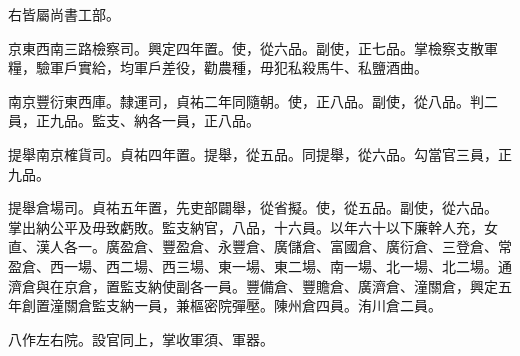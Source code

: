 \begin{pinyinscope}
 右皆屬尚書工部。



 京東西南三路檢察司。興定四年置。使，從六品。副使，正七品。掌檢察支散軍糧，驗軍戶實給，均軍戶差役，勸農種，毋犯私殺馬牛、私鹽酒曲。



 南京豐衍東西庫。隸運司，貞祐二年同隨朝。使，正八品。副使，從八品。判二員，正九品。監支、納各一員，正八品。



 提舉南京榷貨司。貞祐四年置。提舉，從五品。同提舉，從六品。勾當官三員，正九品。



 提舉倉場司。貞祐五年置，先吏部闢舉，從省擬。使，從五品。副使，從六品。
 掌出納公平及毋致虧敗。監支納官，八品，十六員。以年六十以下廉幹人充，女直、漢人各一。廣盈倉、豐盈倉、永豐倉、廣儲倉、富國倉、廣衍倉、三登倉、常盈倉、西一場、西二場、西三場、東一場、東二場、南一場、北一場、北二場。通濟倉與在京倉，置監支納使副各一員。豐備倉、豐贍倉、廣濟倉、潼關倉，興定五年創置潼關倉監支納一員，兼樞密院彈壓。陳州倉四員。洧川倉二員。



 八作左右院。設官同上，掌收軍須、軍器。



\end{pinyinscope}